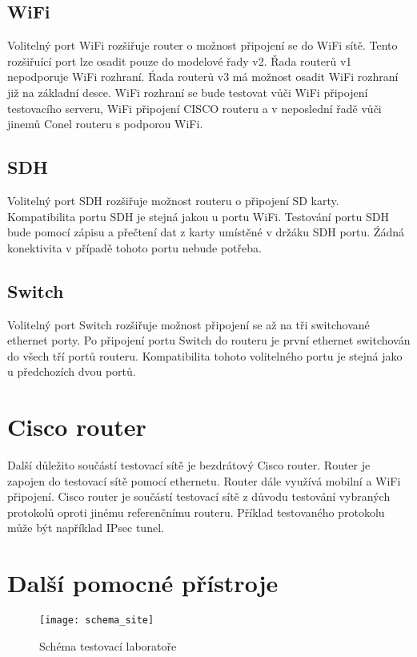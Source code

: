 \subsection{WiFi}
Volitelný port WiFi rozšiřuje router o možnost připojení se do WiFi sítě. Tento rozšiřuící port lze osadit pouze do modelové řady v2. Řada routerů v1 nepodporuje WiFi rozhraní. Ŕada routerů v3 má možnost osadit WiFi rozhraní již na základní desce. WiFi rozhraní se bude testovat vůči WiFi připojení testovacího serveru, WiFi připojení CISCO routeru a v neposlední řadě vůči jinemů Conel routeru s podporou WiFi.

\subsection{SDH}
Volitelný port SDH rozšiřuje možnost routeru o připojení SD karty. Kompatibilita portu SDH je stejná jakou u portu WiFi. Testování portu SDH bude pomocí zápisu a přečtení dat z karty umístěné v držáku SDH portu. Źádná konektivita v případě tohoto portu nebude potřeba.

\subsection{Switch}
Volitelný port Switch rozšiřuje možnost připojení se až na tři switchované ethernet porty. Po připojení portu Switch do routeru je první ethernet switchován do všech tří portů routeru. Kompatibilita tohoto volitelného portu je stejná jako u předchozích dvou portů.

\section{Cisco router}
Další důležito součástí testovací sítě je bezdrátový Cisco router. Router je zapojen do testovací sítě pomocí ethernetu. Router dále využívá mobilní a WiFi připojení. Cisco router je součástí testovací sítě z důvodu testování vybraných protokolů oproti jinému referenčnímu routeru. Příklad testovaného protokolu může být například IPsec tunel.

\section{Další pomocné přístroje}

\begin{figure}[h]
  \centering
  \texttt{[image: schema\_site]}
  \caption{Schéma testovací laboratoře}
  \label{fig:schema_site}
\end{figure}

\endinput
